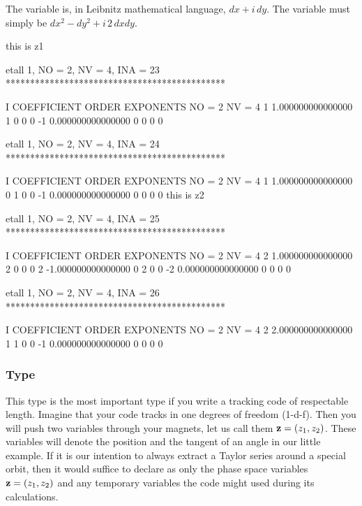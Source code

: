 \documentclass[english,12pt,article]{article} %
\begin{document}
The variable  is, in Leibnitz  mathematical  language, $dx+i \, dy$. The variable  must simply be $dx^2-dy^2+i\, 2\, dx dy$.
\begin{example1}
  this is z1

 etall    1, NO =    2, NV =    4, INA =   23
 *********************************************

    I  COEFFICIENT          ORDER   EXPONENTS
      NO =     2      NV =     4
   1   1.000000000000000       1  0  0  0
    -1   0.000000000000000       0  0  0  0

 etall    1, NO =    2, NV =    4, INA =   24
 *********************************************

    I  COEFFICIENT          ORDER   EXPONENTS
      NO =     2      NV =     4
   1   1.000000000000000       0  1  0  0
    -1   0.000000000000000       0  0  0  0
  this is z2

 etall    1, NO =    2, NV =    4, INA =   25
 *********************************************

    I  COEFFICIENT          ORDER   EXPONENTS
      NO =     2      NV =     4
   2   1.000000000000000       2  0  0  0
   2  -1.000000000000000       0  2  0  0
    -2   0.000000000000000       0  0  0  0

 etall    1, NO =    2, NV =    4, INA =   26
 *********************************************

    I  COEFFICIENT          ORDER   EXPONENTS
      NO =     2      NV =     4
   2   2.000000000000000       1  1  0  0
    -1   0.000000000000000       0  0  0  0
\end{example1}

 \subsubsection{Type \protect{}}  \label{sec:real8code}


This type is the most important type if you write a tracking code of respectable length.  Imagine that your code tracks in one degrees of freedom (1-d-f). Then you will push two variables through your magnets, let us call them ${\bf z}=(z_1,z_2)$. These variables will denote  the position and the tangent of an angle in our little example.  If it is our  intention to always extract a Taylor series around a special orbit, then  it would suffice to declare as  only the phase space variables ${\bf z}=(z_1,z_2)$ and any temporary variables the code might used during its calculations. 
\end{document}
